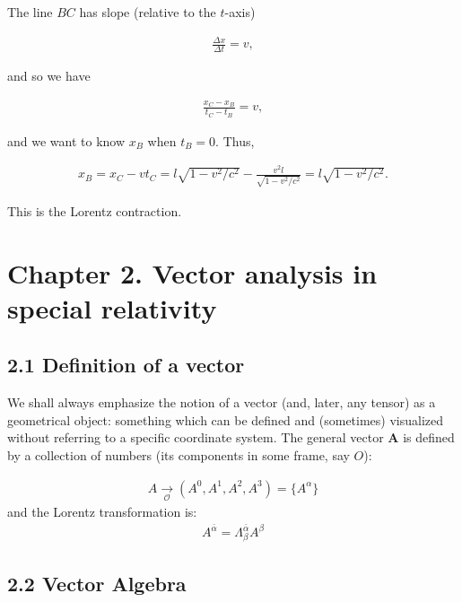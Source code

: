 \documentclass[11pt,letterpaper]{book}
\begin{document}
        The line \( BC \) has slope (relative to the \( t \)-axis) 
        
        \begin{align}
        \frac{\Delta x}{\Delta t} = v,
        \end{align}
        
        and so we have
        
        \begin{align}
        \frac{x_C - x_B}{t_C - t_B} = v,
        \end{align}
        
        and we want to know \( x_B \) when \( t_B = 0 \). Thus,
        
        \begin{align}
        x_B = x_C - vt_C = l \sqrt{1 - v^2/c^2} - \frac{v^2l}{\sqrt{1 - v^2/c^2}} = l \sqrt{1 - v^2/c^2}.
        \end{align}
        
        This is the Lorentz contraction.
                
\section{Chapter 2. Vector analysis in special relativity}

    \subsection{2.1 Definition of a vector}

        We shall always emphasize the notion of a vector (and, later, any tensor) as a geometrical object: something which can be defined and (sometimes) visualized without referring to a specific coordinate system.
        The general vector \( \mathbf{A} \) is defined by a collection of numbers (its components in some frame, say \( O \)):

        \begin{align}
        A \underset{\mathcal{O}}{\rightarrow} (A^0, A^1, A^2, A^3) = \{A^\alpha\} 
        \end{align}
        and the Lorentz transformation is:
        \begin{align}
            A^{\bar{\alpha}}=\Lambda^{\bar{\alpha}}_\beta A^\beta
        \end{align}
    
    \subsection{2.2 Vector Algebra}
\end{document}
